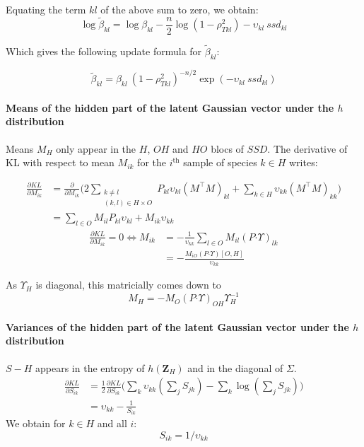 \documentclass[11pt,a4paper]{article}
\newcommand{\Zbf}{\boldsymbol{Z}}
\newcommand{\had}{\boldsymbol{\cdot}}
\begin{document}
 
Equating the term $kl$ of the above sum to zero, we obtain:
 $$\log \widetilde{\beta}_{kl} = \log \beta_{kl} - \frac{n}{2} \log  (1-\rho_{Tkl}^2) - \upsilon_{kl}\:ssd_{kl} $$
 
Which gives the following update formula for $\widetilde{\beta}_{kl}$:
 
  $$\boxed{\displaystyle \widetilde{\beta}_{kl} = \beta_{kl} \: (1-\rho_{Tkl}^2)^{-n/2} \exp( -\upsilon_{kl}\: ssd_{kl} ) }$$


\paragraph{Means of the hidden part of the latent Gaussian vector under the $h$ distribution \\}
Means $M_H$ only appear in the $H$, $OH$ and $HO$ blocs of $SSD$. The derivative of KL with respect to mean $M_{ik}$ for the $i^\text{th}$ sample of species $k\in H$ writes:

\begin{align*}
\frac{\partial KL}{\partial M_{ik}} &= \frac{\partial}{\partial M_{ik}}\Big(2\sum_{\substack{k \neq l\\
(k, l) \in H\times O}} P_{kl} \upsilon_{kl} (M^\intercal M)_{kl} + \sum_{k\in H} \upsilon_{kk} (M^\intercal M)_{kk}\Big)\\
&=   \sum_{l \in O } M_{il} P_{kl}\upsilon_{kl} + M_{ik} \upsilon_{kk}
\end{align*}
\begin{align*}
\frac{\partial KL}{\partial M_{ik}}  = 0\iff M_{ik} &= -\frac{1}{\upsilon_{kk}} \sum_{l\in O} M_{il} (P\had\Upsilon)_{lk}\\
&=-\frac{M_{iO} (P\had\Upsilon)[O,H]}{\upsilon_{kk}}
\end{align*}

As $\Upsilon_H$ is diagonal, this  matricially comes down to
$$\boxed{ M_H = -M_O(P\had\Upsilon)_{OH} \Upsilon_H^{-1}}$$


\paragraph{Variances of the hidden part of the latent Gaussian vector under the $h$ distribution \\}
$S-H$ appears in the entropy of $h(\Zbf_H)$ and in the diagonal of $\Sigma$. 
\begin{align*}
\frac{\partial KL}{\partial S_{ik}} &= \frac{1}{2}  \frac{\partial KL}{\partial S_{ik}}  \Big(\sum_k \upsilon_{kk}(\sum_j S_{j k}) - \sum_k \log (\sum_jS_{j k})\Big)\\
&=\upsilon_{kk} - \frac{1}{S_{ik}}
\end{align*}
We obtain for $k\in H$ and all $i$:
$$\boxed{S_{ik} = 1/\upsilon_{kk}}$$
\end{document}
